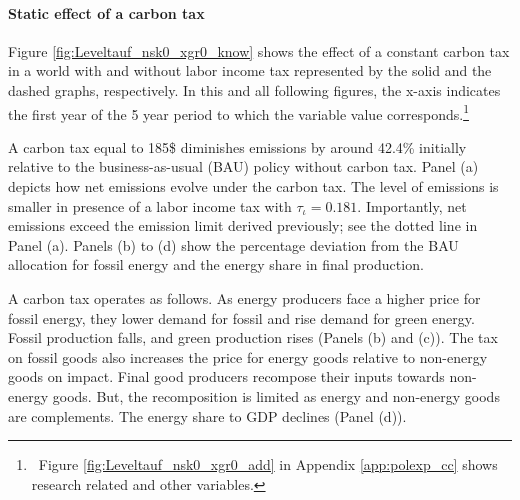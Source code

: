 \begin{figure}[h!!]
\end{figure} 

\paragraph{Static effect of a carbon tax}
 Figure \ref{fig:Leveltauf_nsk0_xgr0_know} shows the effect of a constant carbon tax in a world with and without labor income tax represented by the solid and the dashed graphs, respectively. In this and all following figures, the x-axis indicates the first year of the 5 year period to which the variable value corresponds.\footnote{\ Figure \ref{fig:Leveltauf_nsk0_xgr0_add} in Appendix \ref{app:polexp_cc} shows research related and other variables. }  
 
 A carbon tax equal to 185\$ diminishes emissions by around 42.4\% initially relative to the business-as-usual (BAU) policy without carbon tax.
 Panel (a) depicts how net emissions evolve under the carbon tax. The level of emissions is smaller in presence of a labor income tax with $\tau_{\iota}=0.181$. Importantly, net emissions exceed the emission limit  derived previously; see the dotted line in Panel (a). Panels (b) to (d) show the percentage deviation from the BAU allocation for fossil energy and the energy share in final production. 
 
A carbon tax operates as follows. As energy producers face a higher price for fossil energy, they lower demand for fossil and rise demand for green energy. Fossil production falls, and green production rises (Panels (b) and (c)).
 The tax on fossil goods also increases the price for energy goods relative to non-energy goods on impact. Final good producers recompose their inputs towards non-energy goods. But, the recomposition is limited as energy and non-energy goods are complements. The energy share to GDP declines (Panel (d)).  
 
